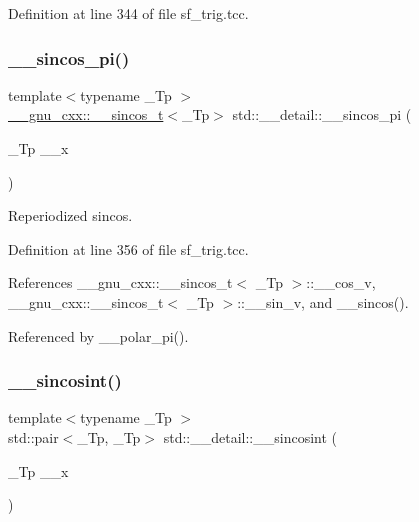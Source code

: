 Definition at line 344 of file sf\+\_\+trig.\+tcc.

\mbox{\label{namespacestd_1_1____detail_af17af8caca5ba47597cc314e93ba49cd}} 
\subsubsection{\texorpdfstring{\+\_\+\+\_\+sincos\+\_\+pi()}{\_\_sincos\_pi()}}
{\footnotesize\ttfamily template$<$typename \+\_\+\+Tp $>$ \\
\hyperlink{struct____gnu__cxx_1_1____sincos__t}{\+\_\+\+\_\+gnu\+\_\+cxx\+::\+\_\+\+\_\+sincos\+\_\+t}$<$\+\_\+\+Tp$>$ std\+::\+\_\+\+\_\+detail\+::\+\_\+\+\_\+sincos\+\_\+pi (\begin{DoxyParamCaption}\item[{\+\_\+\+Tp}]{\+\_\+\+\_\+x }\end{DoxyParamCaption})}

Reperiodized sincos. 

Definition at line 356 of file sf\+\_\+trig.\+tcc.



References \+\_\+\+\_\+gnu\+\_\+cxx\+::\+\_\+\+\_\+sincos\+\_\+t$<$ \+\_\+\+Tp $>$\+::\+\_\+\+\_\+cos\+\_\+v, \+\_\+\+\_\+gnu\+\_\+cxx\+::\+\_\+\+\_\+sincos\+\_\+t$<$ \+\_\+\+Tp $>$\+::\+\_\+\+\_\+sin\+\_\+v, and \+\_\+\+\_\+sincos().



Referenced by \+\_\+\+\_\+polar\+\_\+pi().

\mbox{\label{namespacestd_1_1____detail_a53bf807a99eef68cdb6f917c7ca085bf}} 
\subsubsection{\texorpdfstring{\+\_\+\+\_\+sincosint()}{\_\_sincosint()}}
{\footnotesize\ttfamily template$<$typename \+\_\+\+Tp $>$ \\
std\+::pair$<$\+\_\+\+Tp, \+\_\+\+Tp$>$ std\+::\+\_\+\+\_\+detail\+::\+\_\+\+\_\+sincosint (\begin{DoxyParamCaption}\item[{\+\_\+\+Tp}]{\+\_\+\+\_\+x }\end{DoxyParamCaption})}



